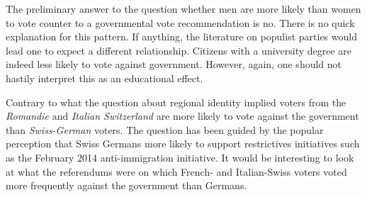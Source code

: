 \documentclass[11pt,a4paper]{article}\usepackage[]{graphicx}\usepackage[]{color}
\begin{document}
    The preliminary answer to the question whether men are more likely than women to vote counter to a governmental vote recommendation is no. There is no quick explanation for this pattern. If anything, the literature on populist parties would lead one to expect a different relationship. Citizens with a university degree are indeed less likely to vote against government. However, again, one should not hastily interpret this as an educational effect. 
    
    Contrary to what the question about regional identity implied voters from the \textit{Romandie} and \textit{Italian Switzerland} are more likely to vote against the government than \textit{Swiss-German} voters. The question has been guided by the popular perception that Swiss Germans more likely to support restrictives initiatives such as the February 2014 anti-immigration initiative. It would be interesting to look at what the referendums were on which French- and Italian-Swiss voters voted more frequently against the government than Germans.
    
\end{document}
